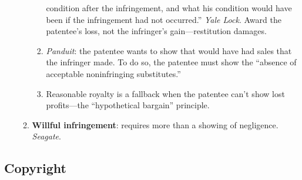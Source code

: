 \begin{enumerate}
\begin{enumerate}
\begin{enumerate}
            condition after the infringement, and what his condition would 
            have been if the infringement had not occurred.'' \emph{Yale 
            Lock}. Award the patentee's loss, not the infringer's 
            gain---restitution damages.
            \item \emph{Panduit}: the patentee wants to show that would have 
            had sales that the infringer made. To do so, the patentee must 
            show the ``absence of acceptable noninfringing substitutes.''
            \item Reasonable royalty is a fallback when the patentee can't 
            show lost profits---the ``hypothetical bargain'' principle.
        \end{enumerate}
        \item \textbf{Willful infringement}: requires more than a showing of 
        negligence. \emph{Seagate}.
    \end{enumerate}
\end{enumerate}

\newpage

\subsection{Copyright}

